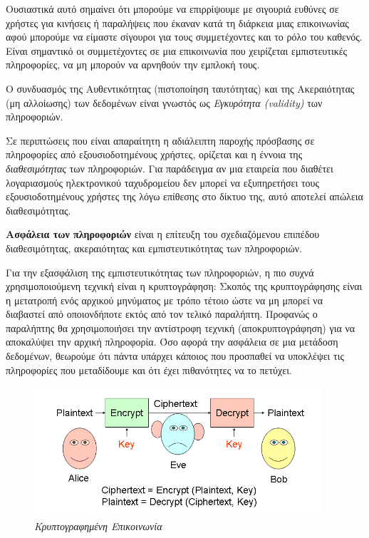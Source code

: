 \begin{itemize}
Ουσιαστικά αυτό σημαίνει ότι μπορούμε να επιρρίψουμε με σιγουριά ευθύνες σε χρήστες για κινήσεις ή παραλήψεις που έκαναν κατά τη διάρκεια μιας επικοινωνίας αφού μπορούμε να είμαστε σίγουροι για τους συμμετέχοντες και το ρόλο του καθενός. Είναι σημαντικό οι συμμετέχοντες σε μια επικοινωνία που χειρίζεται εμπιστευτικές πληροφορίες, να μη μπορούν να αρνηθούν την εμπλοκή τους. 

Ο συνδυασμός της Αυθεντικότητας (πιστοποίηση ταυτότητας) και της Ακεραιότητας (μη αλλοίωσης) των δεδομένων είναι γνωστός ως \emph{Εγκυρότητα (val\-i\-di\-ty)} των πληροφοριών. 

Σε περιπτώσεις που είναι απαραίτητη η αδιάλειπτη παροχής πρόσβασης σε πληροφορίες από εξουσιοδοτημένους χρήστες, ορίζεται και η έννοια της \emph{διαθεσιμότητας} των πληροφοριών. Για παράδειγμα αν μια εταιρεία που διαθέτει λογαριασμούς ηλεκτρονικού ταχυδρομείου δεν μπορεί να εξυπηρετήσει τους εξουσιοδοτημένους χρήστες της λόγω επίθεσης στο δίκτυο της, αυτό αποτελεί απώλεια διαθεσιμότητας.
\end{itemize}

\begin{inthebox}
\textbf{Ασφάλεια των πληροφοριών} είναι η επίτευξη του σχεδιαζόμενου επιπέδου διαθεσιμότητας, ακεραιότητας και εμπιστευτικότητας των πληροφοριών.\\
\end{inthebox}

Για την εξασφάλιση της εμπιστευτικότητας των πληροφοριών, η πιο συχνά χρησιμοποιούμενη τεχνική είναι η κρυπτογράφηση: Σκοπός της κρυπτογράφησης είναι η μετατροπή ενός αρχικού μηνύματος με τρόπο τέτοιο ώστε να μη μπορεί να διαβαστεί από οποιονδήποτε εκτός από τον τελικό παραλήπτη. Προφανώς ο παραλήπτης θα χρησιμοποιήσει την αντίστροφη τεχνική (αποκρυπτογράφηση) για να αποκαλύψει την αρχική πληροφορία. Όσο αφορά την ασφάλεια σε μια μετάδοση δεδομένων, θεωρούμε ότι πάντα υπάρχει κάποιος που προσπαθεί να υποκλέψει τις πληροφορίες που μεταδίδουμε και ότι έχει πιθανότητες να το πετύχει.

\begin{figure}[!ht]
 \centering
 \includegraphics[width=0.95\textwidth]{images/chapter8/8-1}
 \caption {\textsl{Κρυπτογραφημένη Επικοινωνία}}
 \label{8-1}
\end{figure}

